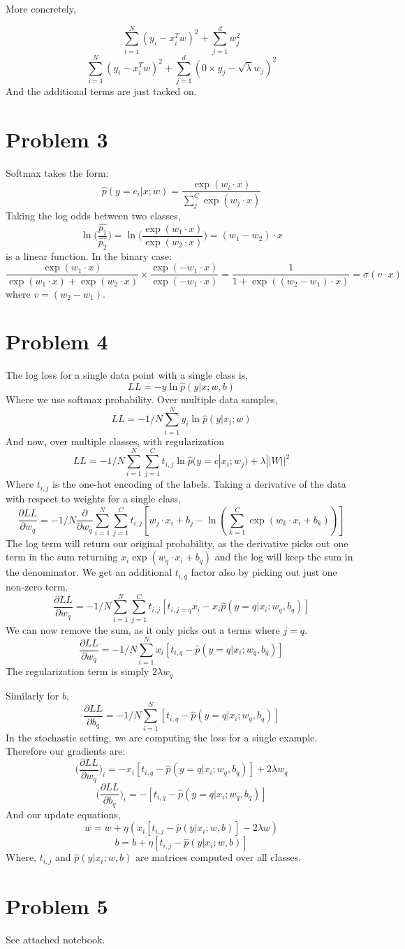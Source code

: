 \documentclass[]{article}
\begin{document}
More concretely,

\[
\sum_{i=1}^{N}(y_i-x_i^Tw)^2 + \sum_{j=1}^{d}w_j^2
\]
\[
\sum_{i=1}^{N}(y_i-x_i^Tw)^2 + \sum_{j=1}^{d}(0\times y_j-\sqrt{\lambda}w_j)^2
\]
And the additional terms are just tacked on.
\section*{Problem 3}
Softmax takes the form:
\[
\hat{p}(y=c_i|x;w) = \frac{\exp(w_i\cdot x)}{\sum_{j}^{C}\exp(w_j\cdot x)}
\]
Taking the log odds between two classes,
\[
\ln\Big(\frac{\hat{p_1}}{\hat{p_2}}\Big) = \ln\Big(\frac{\exp(w_1\cdot x)}{\exp(w_2\cdot x)}\Big) = (w_1-w_2)\cdot x
\]
is a linear function.
In the binary case:
\[
\frac{\exp(w_1\cdot x)}{\exp(w_1\cdot x)+\exp(w_2\cdot x)}\times\frac{\exp(-w_1\cdot x)}{\exp(-w_1\cdot x)} = \frac{1}{1+\exp((w_2-w_1)\cdot x)} = \sigma(v\cdot x)
\]
where $v=(w_2-w_1)$.
\section*{Problem 4}
The log loss for a single data point with a single class is,
\[
LL = -y\ln\hat{p}(y|x;w,b)
\]
Where we use softmax probability. Over multiple data samples,
\[
LL = -1/N\sum_{i=1}^{N} y_i\ln\hat{p}(y|x_i;w)
\]
And now, over multiple classes, with regularization
\[
LL = -1/N\sum_{i=1}^{N}\sum_{j=1}^{C} t_{i,j}\ln\hat{p}(y=c|x_i;w_j) +\lambda||W||^2
\]
Where $t_{i,j}$ is the one-hot encoding of the labels.
Taking a derivative of the data with respect to weights for a single class,
\[
\frac{\partial LL}{\partial w_q} = -1/N\frac{\partial}{\partial w_q}\sum_{i=1}^{N}\sum_{j=1}^{C} t_{i,j}[w_j\cdot x_i+b_j - \ln(\sum_{k=1}^{C}\exp(w_k\cdot x_i + b_k))]
\]
The log term will return our original probability, as the derivative picks out one term in the sum returning $x_i\exp(w_q\cdot x_i + b_q)$ and the log will keep the sum in the denominator. We get an additional $t_{i,q}$ factor also by picking out just one non-zero term.
\[
\frac{\partial LL}{\partial w_q} = -1/N\sum_{i=1}^{N}\sum_{j=1}^{C} t_{i,j}[t_{i,j=q}x_i- x_i\hat{p}(y=q|x_i;w_q,b_q)]
\] 
We can now remove the sum, as it only picks out a terms where $j=q$.
\[
\frac{\partial LL}{\partial w_q} = -1/N\sum_{i=1}^{N}x_i[t_{i,q}- \hat{p}(y=q|x_i;w_q,b_q)]
\]
The regularization term is simply $2\lambda w_q$

Similarly for $b$,
\[
\frac{\partial LL}{\partial b_q} = -1/N\sum_{i=1}^{N}[t_{i,q}- \hat{p}(y=q|x_i;w_q,b_q)]
\]
In the stochastic setting, we are computing the loss for a single example. Therefore our gradients are:
\[
\Big(\frac{\partial LL}{\partial w_q}\Big)_i = - x_i[t_{i,q}- \hat{p}(y=q|x_i;w_q,b_q)] + 2\lambda w_q
\]
\[
\Big(\frac{\partial LL}{\partial b_q}\Big)_i = - [t_{i,q}- \hat{p}(y=q|x_i;w_q,b_q)] 
\]
And our update equations,
\[
w = w + \eta(x_i[t_{i,j}-\hat{p}(y|x_i;w,b)] - 2\lambda w)
\]
\[
b = b + \eta[t_{i,j}-\hat{p}(y|x_i;w,b)] 
\]
Where, $t_{i,j}$ and $\hat{p}(y|x_i;w,b)$ are matrices computed over all classes.
\section*{Problem 5}
See attached notebook.
\end{document}
